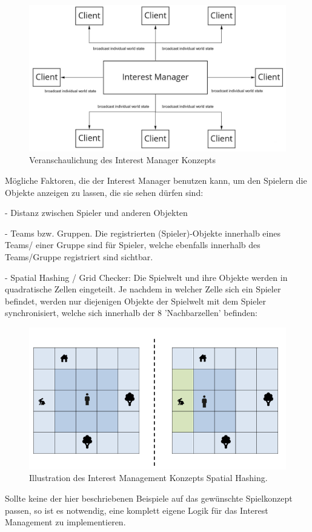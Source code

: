\begin{figure}[H]
	\centering
	\includegraphics[width=150mm]{images/Interest_Manager.jpg}
	\caption[Interest Manager]{Veranschaulichung des Interest Manager Konzepts}
	\label{pic:Interest_Manager}
\end{figure}

Mögliche Faktoren, die der Interest Manager benutzen kann, um den Spielern die Objekte anzeigen zu lassen, die sie sehen dürfen sind:

- Distanz zwischen Spieler und anderen Objekten

- Teams bzw. Gruppen. Die registrierten (Spieler)-Objekte innerhalb eines Teams/ einer Gruppe sind für Spieler, welche ebenfalls innerhalb des Teams/Gruppe registriert sind sichtbar.

- Spatial Hashing / Grid Checker: Die Spielwelt und ihre Objekte werden in quadratische Zellen eingeteilt. Je nachdem in welcher Zelle sich ein Spieler befindet, werden nur diejenigen Objekte der Spielwelt mit dem Spieler synchronisiert, welche sich innerhalb der 8 'Nachbarzellen' befinden:

\begin{figure}[H]
	\centering
	\includegraphics[width=150mm]{images/interest_management.png}
	\caption[Spatial Hashing]{Illustration des Interest Management Konzepts Spatial Hashing. \cite{JeromeRenaux.2017} }
	\label{pic:interest_management}
\end{figure}

Sollte keine der hier beschriebenen Beispiele auf das gewünschte Spielkonzept passen, so ist es notwendig, eine komplett eigene Logik für das Interest Management zu implementieren.
